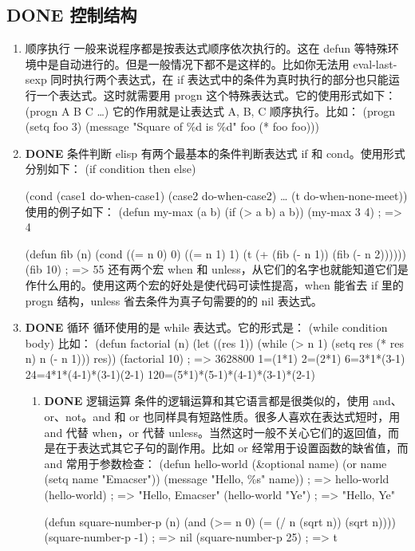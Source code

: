 \documentclass[11pt]{ctexart}
\begin{document}
\subsection{{\bfseries\sffamily DONE} 控制结构}
\label{sec:orga0af27e}
\begin{enumerate}
\item 顺序执行
\label{sec:orgdc439df}
一般来说程序都是按表达式顺序依次执行的。这在 defun 等特殊环境中是自动进行的。但是一般情况下都不是这样的。比如你无法用 eval-last-sexp 同时执行两个表达式，在 if 表达式中的条件为真时执行的部分也只能运行一个表达式。这时就需要用 progn 这个特殊表达式。它的使用形式如下：
(progn A B C \ldots{})
它的作用就是让表达式 A, B, C 顺序执行。比如：
(progn
(setq foo 3)
(message "Square of \%d is \%d" foo (* foo foo)))
\item {\bfseries\sffamily DONE} 条件判断
\label{sec:orgcb02d26}
elisp 有两个最基本的条件判断表达式 if 和 cond。使用形式分别如下：
(if condition
then
else)

(cond (case1 do-when-case1)
(case2 do-when-case2)
\ldots{}
(t do-when-none-meet))
使用的例子如下：
(defun my-max (a b)
(if (> a b)
a b))
(my-max 3 4)                            ; => 4

(defun fib (n)
(cond ((= n 0) 0)
((= n 1) 1)
(t (+ (fib (- n 1))
(fib (- n 2))))))
(fib 10)                                ; => 55
还有两个宏 when 和 unless，从它们的名字也就能知道它们是作什么用的。使用这两个宏的好处是使代码可读性提高，when 能省去 if 里的 progn 结构，unless 省去条件为真子句需要的的 nil 表达式。
\item {\bfseries\sffamily DONE} 循环
\label{sec:orge78f8fa}
循环使用的是 while 表达式。它的形式是：
(while condition
body)
比如：
(defun factorial (n)
(let ((res 1))
(while (> n 1)
(setq res (* res n)
n (- n 1)))
res))
(factorial 10)                          ; => 3628800
1=(1*1)
2=(2*1)
6=3*1*(3-1)
24=4*1*(4-1)*(3-1)(2-1)
120=(5*1)*(5-1)*(4-1)*(3-1)*(2-1)

\begin{enumerate}
\item {\bfseries\sffamily DONE} 逻辑运算
\label{sec:org3be0e24}
条件的逻辑运算和其它语言都是很类似的，使用 and、or、not。and 和 or 也同样具有短路性质。很多人喜欢在表达式短时，用 and 代替 when，or 代替 unless。当然这时一般不关心它们的返回值，而是在于表达式其它子句的副作用。比如 or 经常用于设置函数的缺省值，而 and 常用于参数检查：
(defun hello-world (\&optional name)
(or name (setq name "Emacser"))
(message "Hello, \%s" name))           ; => hello-world
(hello-world)                           ; => "Hello, Emacser"
(hello-world "Ye")                      ; => "Hello, Ye"

(defun square-number-p (n)
(and (>= n 0)
(= (/ n (sqrt n)) (sqrt n))))
(square-number-p -1)                    ; => nil
(square-number-p 25)                    ; => t
\end{enumerate}
\end{enumerate}
\end{document}

